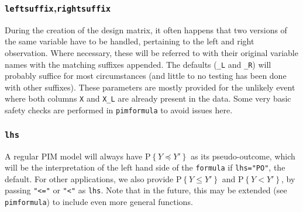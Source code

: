 \documentclass[12pt]{article}
\newcommand{\prob}[1]{\text{P}\left\{#1\right\}}
\newcommand{\leqs}{\preccurlyeq}
\newcommand{\pim}[1]{\texttt{#1}}%
\newcommand{\cd}[1]{\texttt{#1}}%
\begin{document}
\subsubsection{\cd{leftsuffix},\cd{rightsuffix}}
During the creation of the design matrix, it often happens that two versions of the same variable have to be handled, pertaining to the left and right observation. Where necessary, these will be referred to with their original variable names with the matching suffixes appended. The defaults (\cd{\_L} and \cd{\_R}) will probably suffice for most circumstances (and little to no testing has been done with other suffixes). These parameters are mostly provided for the unlikely event where both columns \cd{X} and \cd{X\_L} are already present in the data. Some very basic safety checks are performed in \pim{pimformula} to avoid issues here.
\subsubsection{\cd{lhs}}
A regular PIM model will always have $\prob{Y \leqs Y' }$ as its pseudo-outcome, which will be the interpretation of the left hand side of the \cd{formula} if \cd{lhs="PO"}, the default. For other applications, we also provide $\prob{Y \leq Y' }$ and $\prob{Y < Y' }$, by passing \cd{"<="} or \cd{"<"} as \cd{lhs}. Note that in the future, this may be extended (see \pim{pimformula}) to include even more general functions.
\end{document}
